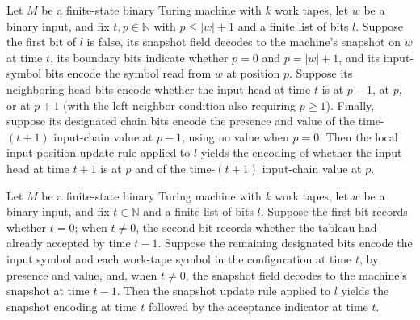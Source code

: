 \begin{theorem}
\label{Complexity.cfgF_inp_succ}
\leanok
{}
Let $M$ be a finite-state binary Turing machine with $k$ work tapes, let $w$ be a binary
input, and fix $t,p\in\mathbb N$ with $p\le |w|+1$ and a finite list of bits $l$.
Suppose the first bit of $l$ is false, its snapshot field decodes to the machine's
snapshot on $w$ at time $t$, its boundary bits indicate whether $p=0$ and $p=|w|+1$, and
its input-symbol bits encode the symbol read from $w$ at position $p$. Suppose its
neighboring-head bits encode whether the input head at time $t$ is at $p-1$, at $p$, or
at $p+1$ (with the left-neighbor condition also requiring $p\ge1$). Finally, suppose its
designated chain bits encode the presence and value of the time-$(t+1)$ input-chain
value at $p-1$, using no value when $p=0$. Then the local input-position update rule
applied to $l$ yields the encoding of whether the input head at time $t+1$ is at $p$ and
of the time-$(t+1)$ input-chain value at $p$.
\end{theorem}

\begin{theorem}
\label{Complexity.cfgF_snap}
\leanok
{}
Let $M$ be a finite-state binary Turing machine with $k$ work tapes, let $w$ be a binary
input, and fix $t\in\mathbb N$ and a finite list of bits $l$. Suppose the first bit
records whether $t=0$; when $t\ne0$, the second bit records whether the tableau had
already accepted by time $t-1$. Suppose the remaining designated bits encode the input
symbol and each work-tape symbol in the configuration at time $t$, by presence and
value, and, when $t\ne0$, the snapshot field decodes to the machine's snapshot at time
$t-1$. Then the snapshot update rule applied to $l$ yields the snapshot encoding at time
$t$ followed by the acceptance indicator at time $t$.
\end{theorem}

